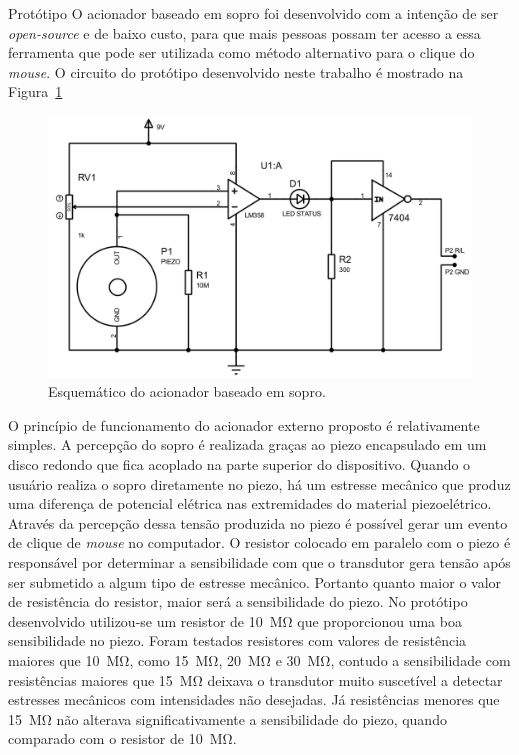 \begin{chapter}{Protótipo}
O acionador baseado em sopro foi desenvolvido com a intenção de ser
\textit{open-source} e de baixo custo, para que mais pessoas possam ter acesso
a essa ferramenta que pode ser utilizada como método alternativo para o clique
do \textit{mouse}. O circuito do protótipo desenvolvido neste trabalho é mostrado 
na Figura~\ref{fig:circuito}

\begin{figure}[!h]
	\centering
	\begin{minipage}[c]{\textwidth}
	\centering
	\includegraphics[width=0.9\linewidth]{fig/acionador}
	\caption{Esquemático do acionador baseado em sopro.}
	\label{fig:circuito}
	\end{minipage}
\end{figure} 

O princípio de funcionamento do acionador externo proposto é relativamente
simples. A percepção do sopro é realizada graças ao piezo encapsulado em um
disco redondo que fica acoplado na parte superior do dispositivo. Quando o
usuário realiza o sopro diretamente no piezo, há um estresse mecânico que produz
uma diferença de potencial elétrica nas extremidades do material piezoelétrico. Através
da percepção dessa tensão produzida no piezo é possível gerar um evento de
clique de \textit{mouse} no computador. O resistor colocado em paralelo com o
piezo é responsável por determinar a sensibilidade com que o transdutor gera
tensão após ser submetido a algum tipo de estresse mecânico. Portanto quanto
maior o valor de resistência do resistor, maior será a sensibilidade do piezo.
No protótipo desenvolvido utilizou-se um resistor de 10~M\si{\ohm}  que
proporcionou uma boa sensibilidade no piezo. Foram testados resistores com
valores de resistência maiores que 10~M\si{\ohm}, como 15~M\si{\ohm}, 20~M\si{\ohm} e
30~M\si{\ohm}, contudo a sensibilidade com resistências maiores que 15~M\si{\ohm}
deixava o transdutor muito suscetível a detectar estresses mecânicos com
intensidades não desejadas. Já resistências menores que 15~M\si{\ohm} não
alterava significativamente a sensibilidade do piezo, quando comparado com o
resistor de 10~M\si{\ohm}. 


\end{chapter}

